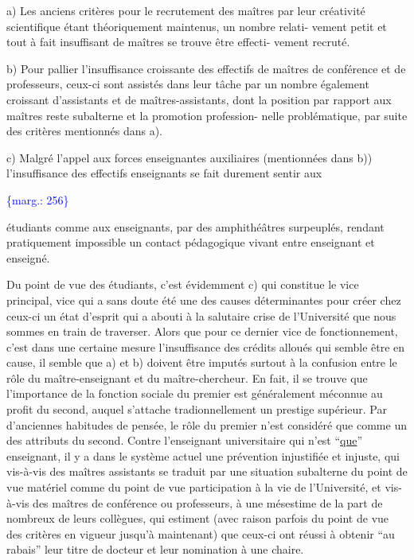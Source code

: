 \documentclass[11pt]{article}
\newcommand{\scanpage}[1]{\par\bigskip\noindent{\small\sffamily[scan #1]}\par}
\newcommand{\mspage}[1]{{\small\sffamily[p.\,#1]}}
\newcommand{\margin}[1]{\textcolor{blue}{\{\textsf{marg.:} #1\}}}
\newcommand{\uline}[1]{\underline{#1}}
\begin{document}
a) Les anciens critères pour le recrutement des maîtres par leur
créativité scientifique étant théoriquement maintenus, un nombre relati-%
vement petit et tout à fait insuffisant de maîtres se trouve être effecti-%
vement recruté.

b) Pour pallier l'insuffisance croissante des effectifs de maîtres
de conférence et de professeurs, ceux-ci sont assistés dans leur tâche par
un nombre également croissant d'assistants et de maîtres-assistants, dont la
position par rapport aux maîtres reste subalterne et la promotion profession-%
nelle problématique, par suite des critères mentionnés dans a).

c) Malgré l'appel aux forces enseignantes auxiliaires (mentionnées
dans b)) l'insuffisance des effectifs enseignants se fait durement sentir aux

\margin{256}

\clearpage
\scanpage{119/257}
\mspage{4}

étudiants comme aux enseignants, par des amphithéâtres surpeuplés, rendant
pratiquement impossible un contact pédagogique vivant entre enseignant et
enseigné.

Du point de vue des étudiants, c'est évidemment c) qui constitue le
vice principal, vice qui a sans doute été une des causes déterminantes pour
créer chez ceux-ci un état d'esprit qui a abouti à la salutaire crise de
l'Université que nous sommes en train de traverser. Alors que pour ce dernier
vice de fonctionnement, c'est dans une certaine mesure l'insuffisance des crédits
alloués qui semble être en cause, il semble que a) et b) doivent être imputés
surtout à la confusion entre le rôle du maître-enseignant et du maître-chercheur.
En fait, il se trouve que l'importance de la fonction sociale du premier est
généralement méconnue au profit du second, auquel s'attache tradionnellement
un prestige supérieur. Par d'anciennes habitudes de pensée, le rôle du premier
n'est considéré que comme un des attributs du second. Contre l'enseignant
universitaire qui n'est ``\uline{que}'' enseignant, il y a dans le système actuel une
prévention injustifiée et injuste, qui vis-à-vis des maîtres assistants se
traduit par une situation subalterne du point de vue matériel comme du point
de vue participation à la vie de l'Université, et vis-à-vis des maîtres de
conférence ou professeurs, à une mésestime de la part de nombreux de leurs
collègues, qui estiment (avec raison parfois du point de vue des critères
en vigueur jusqu'à maintenant) que ceux-ci ont réussi à obtenir ``au rabais''
leur titre de docteur et leur nomination à une chaire.
\end{document}
